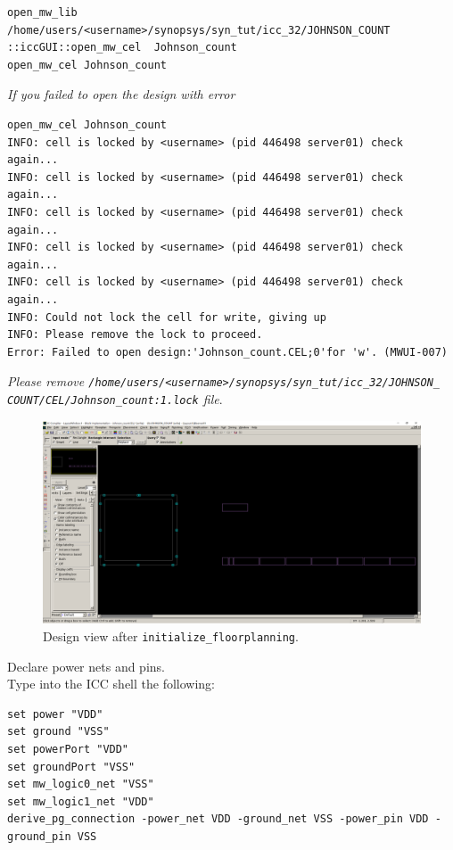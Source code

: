 \documentclass[a4paper,12pt,twoside]{article}
\begin{document}
\begin{enumerate}
\begin{enumerate}
        \begin{verbatim}
open_mw_lib /home/users/<username>/synopsys/syn_tut/icc_32/JOHNSON_COUNT
::iccGUI::open_mw_cel  Johnson_count
open_mw_cel Johnson_count
        \end{verbatim}
        \textit{If you failed to open the design with error}
        \begin{verbatim}
open_mw_cel Johnson_count
INFO: cell is locked by <username> (pid 446498 server01) check again...
INFO: cell is locked by <username> (pid 446498 server01) check again...
INFO: cell is locked by <username> (pid 446498 server01) check again...
INFO: cell is locked by <username> (pid 446498 server01) check again...
INFO: cell is locked by <username> (pid 446498 server01) check again...
INFO: Could not lock the cell for write, giving up
INFO: Please remove the lock to proceed.
Error: Failed to open design:'Johnson_count.CEL;0'for 'w'. (MWUI-007)
        \end{verbatim}
        \textit{Please remove \texttt{/home/users/<username>/synopsys/syn\_tut/icc\_32/JOHNSON\_\\
        COUNT/CEL/Johnson\_count:1.lock} file}.
        \begin{figure}[H]
            \centering
            \includegraphics[width=\textwidth]{images/10.png}
            \caption{Design view after \texttt{initialize\_floorplanning}.}
            \label{f10}
        \end{figure}
        Declare power nets and pins.\\
        Type into the ICC shell the following:
        \begin{verbatim}
set power "VDD"
set ground "VSS"
set powerPort "VDD"
set groundPort "VSS"
set mw_logic0_net "VSS"
set mw_logic1_net "VDD"
derive_pg_connection -power_net VDD -ground_net VSS -power_pin VDD -ground_pin VSS

\end{verbatim}
\end{enumerate}
\end{enumerate}
\end{document}

